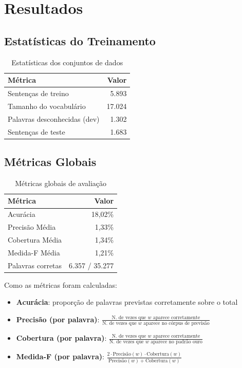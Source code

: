\documentclass[12pt,a4paper]{article}
\begin{document}
\section{Resultados}

\subsection{Estatísticas do Treinamento}

\begin{table}[H]
\centering
\begin{tabular}{lr}
\toprule
\textbf{Métrica} & \textbf{Valor} \\
\midrule
Sentenças de treino & 5.893 \\
Tamanho do vocabulário & 17.024 \\
Palavras desconhecidas (dev) & 1.302 \\
Sentenças de teste & 1.683 \\
\bottomrule
\end{tabular}
\caption{Estatísticas dos conjuntos de dados}
\end{table}

\subsection{Métricas Globais}

\begin{table}[H]
\centering
\begin{tabular}{lr}
\toprule
\textbf{Métrica} & \textbf{Valor} \\
\midrule
Acurácia & 18,02\% \\
Precisão Média & 1,33\% \\
Cobertura Média & 1,34\% \\
Medida-F Média & 1,21\% \\
Palavras corretas & 6.357 / 35.277 \\
\bottomrule
\end{tabular}
\caption{Métricas globais de avaliação}
\end{table}

Como as métricas foram calculadas:

\begin{itemize}
    \item \textbf{Acurácia}: proporção de palavras previstas corretamente sobre o total
    \item \textbf{Precisão (por palavra)}: $\frac{\text{N. de vezes que } w \text{ aparece corretamente}}{\text{N. de vezes que } w \text{ aparece no córpus de previsão}}$
    \item \textbf{Cobertura (por palavra)}: $\frac{\text{N. de vezes que } w \text{ aparece corretamente}}{\text{N. de vezes que } w \text{ aparece no padrão ouro}}$
    \item \textbf{Medida-F (por palavra)}: $\frac{2 \cdot \text{Precisão}(w) \cdot \text{Cobertura}(w)}{\text{Precisão}(w) + \text{Cobertura}(w)}$
\end{itemize}
\end{document}
